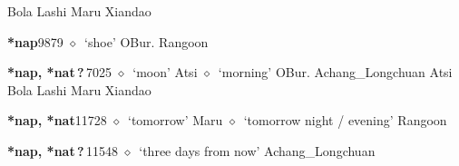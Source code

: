 \begin{list}{}{\leftmargin=1.5em \itemindent=-1.5em}
\hspace{1ex}
         Bola 
\hspace{1ex}
         Lashi 
\hspace{1ex}
         Maru 
\hspace{1ex}
         Xiandao 
  \item {\footnotesize \textbf{*nap}}{\tiny 9879}
\hspace{1ex}
         $\diamond$~`shoe'
         OBur. 
\hspace{1ex}
         Rangoon 
  \item {\footnotesize \textbf{*nap, *nat\,?\,}}{\tiny 7025}
\hspace{1ex}
         $\diamond$~`moon'
         Atsi 
\hspace{1ex}
         $\diamond$~`morning'
         OBur. 
\hspace{1ex}
         Achang\_Longchuan 
\hspace{1ex}
         Atsi 
\hspace{1ex}
         Bola 
\hspace{1ex}
         Lashi 
\hspace{1ex}
         Maru 
\hspace{1ex}
         Xiandao 
  \item {\footnotesize \textbf{*nap, *nat}}{\tiny 11728}
\hspace{1ex}
         $\diamond$~`tomorrow'
         Maru 
\hspace{1ex}
         $\diamond$~`tomorrow night / evening'
         Rangoon 
  \item {\footnotesize \textbf{*nap, *nat\,?\,}}{\tiny 11548}
\hspace{1ex}
         $\diamond$~`three days from now'
         Achang\_Longchuan 

\end{list}
